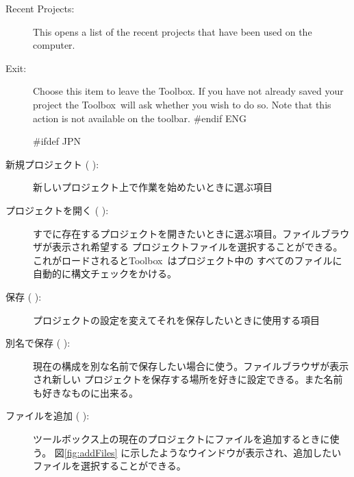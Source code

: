 \documentclass[\pformat,12pt]{article}
\newcommand{\Toolbox}{Toolbox}
\newcommand{\Toolbox}{Toolbox}
\newcommand{\guicmd}[1]{{\sf #1}}
\newcommand{\guicmd}[1]{{\gt #1}}
\begin{document}
\begin{description}
\item[\guicmd{Recent Projects}:]
  This opens a list of the recent projects that have been used on the
  computer.

\item[\guicmd{Exit}:] Choose this item to leave the \Toolbox. If you
  have not already saved your project the \Toolbox\ will ask whether
  you wish to do so. Note that this action is not available on the
  toolbar. 
#endif ENG

#ifdef JPN
\item[\guicmd{新規プロジェクト} (\hspace{-1.8mm}
):]
  新しいプロジェクト上で作業を始めたいときに選ぶ項目

\item[\guicmd{プロジェクトを開く} (\hspace{-1.2mm}
\hspace{.6mm}):]
  すでに存在するプロジェクトを開きたいときに選ぶ項目。ファイルブラウザが表示され希望する
  プロジェクトファイルを選択することができる。これがロードされると\Toolbox\ はプロジェクト中の
  すべてのファイルに自動的に構文チェックをかける。

\item[\guicmd{保存} (\hspace{-1.8mm}
):]
  プロジェクトの設定を変えてそれを保存したいときに使用する項目

\item[\guicmd{別名で保存} (\hspace{-1.5mm}
):]
  現在の構成を別な名前で保存したい場合に使う。ファイルブラウザが表示され新しい
  プロジェクトを保存する場所を好きに設定できる。また名前も好きなものに出来る。

\item[\guicmd{ファイルを追加} (\hspace{-1.5mm}
):] 
  ツールボックス上の現在のプロジェクトにファイルを追加するときに使う。
  図\ref{fig:addFiles} に示したようなウインドウが表示され、追加したいファイルを選択することができる。


\end{description}
\end{document}
